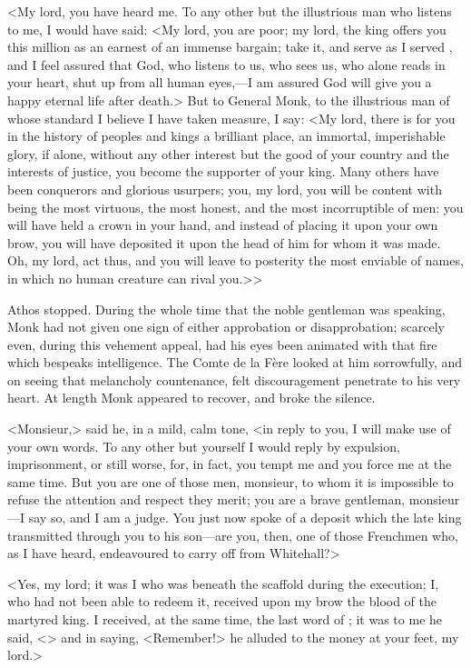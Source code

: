 <My lord, you have heard me. To any other but the illustrious man who listens to me, I would have said: <My lord, you are poor; my lord, the king offers you this million as an earnest of an immense bargain; take it, and serve  as I served , and I feel assured that God, who listens to us, who sees us, who alone reads in your heart, shut up from all human eyes,—I am assured God will give you a happy eternal life after death.> But to General Monk, to the illustrious man of whose standard I believe I have taken measure, I say: <My lord, there is for you in the history of peoples and kings a brilliant place, an immortal, imperishable glory, if alone, without any other interest but the good of your country and the interests of justice, you become the supporter of your king. Many others have been conquerors and glorious usurpers; you, my lord, you will be content with being the most virtuous, the most honest, and the most incorruptible of men: you will have held a crown in your hand, and instead of placing it upon your own brow, you will have deposited it upon the head of him for whom it was made. Oh, my lord, act thus, and you will leave to posterity the most enviable of names, in which no human creature can rival you.>>

Athos stopped. During the whole time that the noble gentleman was speaking, Monk had not given one sign of either approbation or disapprobation; scarcely even, during this vehement appeal, had his eyes been animated with that fire which bespeaks intelligence. The Comte de la Fère looked at him sorrowfully, and on seeing that melancholy countenance, felt discouragement penetrate to his very heart. At length Monk appeared to recover, and broke the silence.

<Monsieur,> said he, in a mild, calm tone, <in reply to you, I will make use of your own words. To any other but yourself I would reply by expulsion, imprisonment, or still worse, for, in fact, you tempt me and you force me at the same time. But you are one of those men, monsieur, to whom it is impossible to refuse the attention and respect they merit; you are a brave gentleman, monsieur—I say so, and I am a judge. You just now spoke of a deposit which the late king transmitted through you to his son—are you, then, one of those Frenchmen who, as I have heard, endeavoured to carry off  from Whitehall?>

<Yes, my lord; it was I who was beneath the scaffold during the execution; I, who had not been able to redeem it, received upon my brow the blood of the martyred king. I received, at the same time, the last word of ; it was to me he said, <> and in saying, <Remember!> he alluded to the money at your feet, my lord.>

